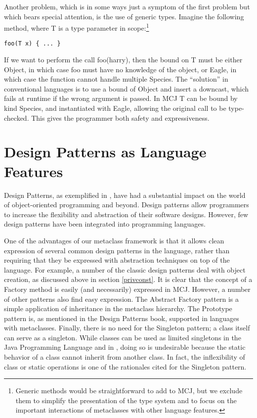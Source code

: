 \documentclass{acm-sigplan}
\begin{document}
Another problem, which is in some ways just a symptom of the first
problem but which bears special attention, is the use of generic
types.  Imagine the following method, where T is a type parameter in
scope:\footnote{Generic methods would be straightforward to add to
MCJ, but we exclude them to simplify the presentation of the type
system and to focus on the important interactions of metaclasses with
other language features.}

\begin{verbatim}
foo(T x) { ... }
\end{verbatim}

If we want to perform the call {\txt foo(harry)}, then the bound on
{\txt T} must be either {\txt Object}, in which case {\txt foo} must
have no knowledge of the object, or Eagle, in which case the function
cannot handle multiple {\txt Species}.  The ``solution'' in
conventional languages is to use a bound of {\txt Object} and insert a
downcast, which fails at runtime if the wrong argument is passed.  In
MCJ {\txt T} can be bound by kind {\txt Species}, and instantiated
with {\txt Eagle}, allowing the original call to be type-checked.
This gives the programmer both safety and expressiveness.

\section{Design Patterns as Language Features}
\label{designpatterns}

Design Patterns, as exemplified in \cite{GOF}, have had a
substantial impact on the world of object-oriented programming and
beyond.  Design patterns allow programmers to increase the flexibility
and abstraction of their software designs.  However, few design
patterns have been integrated into programming languages.

One of the advantages of our metaclass framework is that it allows
clean expression of several common design patterns in the language,
rather than requiring that they be expressed with abstraction
techniques on top of the language.  For example, a number of the
classic design patterns deal with object creation, as discussed above
in section \ref{privconst}.  It is clear that the concept of a Factory
method is easily (and necessarily) expressed in MCJ.  However, a
number of other patterns also find easy expression.  The Abstract
Factory pattern is a simple application of inheritance in the
metaclass hierarchy.  The Prototype pattern is, as mentioned in the
Design Patterns book, supported in languages with metaclasses.
Finally, there is no need for the Singleton pattern; a class itself
can serve as a singleton.  While classes can be used as limited
singletons in the Java Programming Language and in \Cpp, doing so is
undesirable because the static behavior of a class cannot inherit from
another class.  In fact, the inflexibility of class or static
operations is one of the rationales cited for the Singleton pattern.
\end{document}
